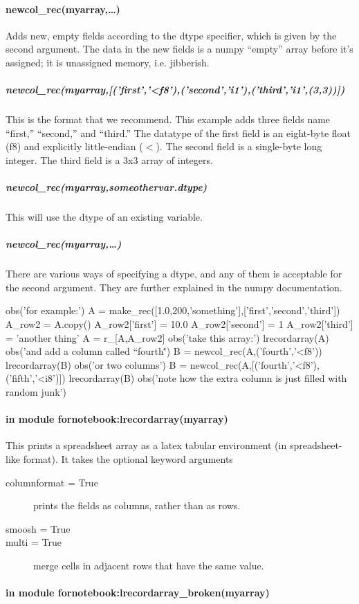 \paragraph{newcol\_rec(myarray,\ldots)}
Adds new, empty fields according to the dtype specifier,
    which is given by the second argument.
The data in the new fields is a numpy ``empty'' array
    before it's assigned;
    it is unassigned memory,
    i.e. jibberish.

\subparagraph{newcol\_rec(myarray,[('first','<f8'),('second','i1'),('third','i1',(3,3))])}
This is the format that we recommend.
This example adds three fields name ``first,'' ``second,'' and ``third.'' 
The datatype of the first field is an eight-byte float (f8) and explicitly
    little-endian ($<$).
The second field is a single-byte long integer.
The third field is a 3x3 array of integers.

\subparagraph{newcol\_rec(myarray,someothervar.dtype)}
This will use the dtype of an existing variable.

\subparagraph{newcol\_rec(myarray,\ldots)}
There are various ways of specifying a dtype, and any of them is acceptable
    for the second argument.
They are further explained in the numpy documentation.

\begin{python}
obs('for example:')
A = make_rec([1.0,200,'something'],['first','second','third'])
A_row2 = A.copy()
A_row2['first'] = 10.0
A_row2['second'] = 1
A_row2['third'] = 'another thing'
A = r_[A,A_row2]
obs('take this array:')
lrecordarray(A)
obs('and add a column called ``fourth\'\'')
B = newcol_rec(A,('fourth','<f8'))
lrecordarray(B)
obs('or two columns')
B = newcol_rec(A,[('fourth','<f8'),('fifth','<i8')])
lrecordarray(B)
obs('note how the extra column is just filled with random junk')
\end{python}

\paragraph{{\scriptsize in module fornotebook:}lrecordarray(myarray)}
This prints a spreadsheet array
    as a latex tabular environment (in spreadsheet-like format).
It takes the optional keyword arguments
\begin{mykwargs}
    \begin{description}
        \item[columnformat = True] prints the fields as columns, rather than as rows.
        \item[smoosh = True] 
        \item[multi = True] merge cells in adjacent rows that have the same value.
    \end{description}
\end{mykwargs}
\paragraph{{\scriptsize in module fornotebook:}lrecordarray\_broken(myarray)}
